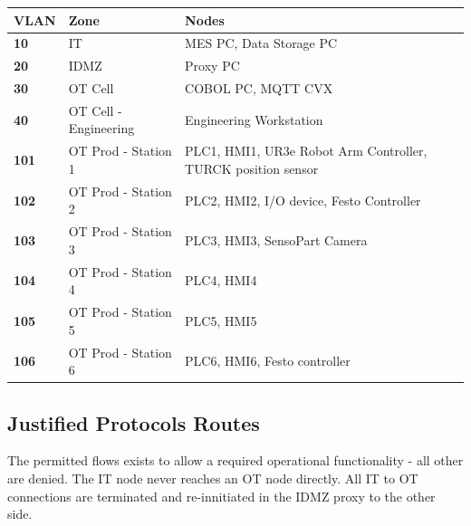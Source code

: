 \renewcommand{\arraystretch}{1.3} %
\begin{tabularx}{\textwidth}{>{\bfseries}p{2.5cm} X X}
    VLAN & \textbf{Zone} & \textbf{Nodes} \vspace{0.5em}\\
\toprule
    10 & IT & MES PC, Data Storage PC \\
    20 & IDMZ & Proxy PC\\
    30 & OT Cell & COBOL PC, MQTT CVX \\
    40 & OT Cell - Engineering & Engineering Workstation  \\
    101 & OT Prod - Station 1 & PLC1, HMI1, UR3e Robot Arm Controller, TURCK position sensor \\
    102 & OT Prod - Station 2 & PLC2, HMI2, I/O device, Festo Controller \\
    103 & OT Prod - Station 3 & PLC3, HMI3, SensoPart Camera \\
    104 & OT Prod - Station 4 & PLC4, HMI4 \\
    105 & OT Prod - Station 5 & PLC5, HMI5 \\
    106 & OT Prod - Station 6 & PLC6, HMI6, Festo controller \\
\end{tabularx}

\pagebreak
\subsection{Justified Protocols Routes}
The permitted flows exists to allow a required operational
functionality - all other are denied.
The IT node never reaches an OT node directly. All IT to OT connections are terminated
and re-innitiated in the IDMZ proxy to the other side. \\ \vspace{1em}

